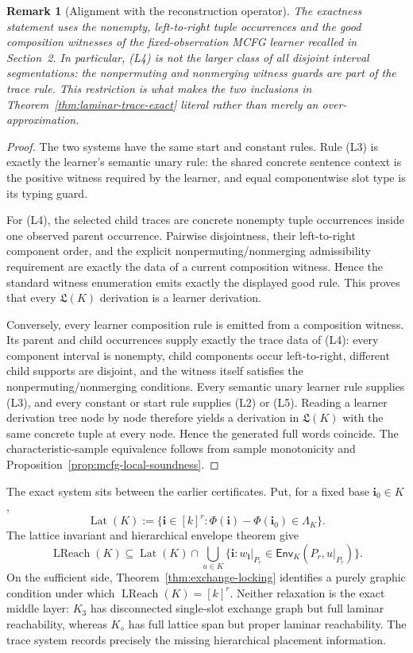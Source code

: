 \documentclass[11pt]{article}
\newtheorem{remark}[definition]{Remark}
\newcommand{\Env}{\mathsf{Env}}
\begin{document}
\begin{remark}[Alignment with the reconstruction operator]
The exactness statement uses the nonempty, left-to-right tuple occurrences and
the good composition witnesses of the fixed-observation MCFG learner recalled in Section~2.  In particular, (L4) is not the larger class of all
disjoint interval segmentations: the nonpermuting and nonmerging witness guards
are part of the trace rule.  This restriction is what makes the two inclusions
in Theorem~\ref{thm:laminar-trace-exact} literal rather than merely an
over-approximation.
\end{remark}

\begin{proof}
The two systems have the same start and constant rules.  Rule (L3) is exactly
the learner's semantic unary rule: the shared concrete sentence context is the
positive witness required by the learner, and equal componentwise slot type is
its typing guard.

For (L4), the selected child traces are concrete nonempty tuple
occurrences inside one observed parent occurrence.  Pairwise disjointness,
their left-to-right component order, and the explicit nonpermuting/nonmerging
admissibility requirement are exactly the data of a current composition
witness.  Hence the standard witness enumeration emits exactly the displayed
good rule.  This proves that every $\mathfrak L(K)$ derivation is a learner
derivation.

Conversely, every learner composition rule is emitted from a composition
witness.  Its parent and child occurrences supply exactly the trace data of
(L4): every component interval is nonempty, child components occur
left-to-right, different child supports are disjoint, and the witness itself
satisfies the nonpermuting/nonmerging conditions.  Every semantic unary learner
rule supplies (L3), and every constant or start rule supplies (L2) or (L5).
Reading a learner derivation tree node by node therefore yields a derivation in
$\mathfrak L(K)$ with the same concrete tuple at every node.  Hence the
generated full words coincide.  The characteristic-sample equivalence follows from sample monotonicity and
Proposition~\ref{prop:mcfg-local-soundness}.
\end{proof}

The exact system sits between the earlier certificates.  Put, for a fixed base
$\mathbf i_0\in K$,
\[
  \operatorname{Lat}(K)
  :=\{\mathbf i\in[k]^r:
       \Phi(\mathbf i)-\Phi(\mathbf i_0)\in\Lambda_K\}.
\]
The lattice invariant and hierarchical envelope theorem give
\[
  \boxed{
  \operatorname{LReach}(K)
  \subseteq
  \operatorname{Lat}(K)
  \cap
  \bigcup_{u\in K}
  \{\mathbf i:
      w_{\mathbf i}|_{P_r}\in\Env_K(P_r,u|_{P_r})\}.
  }
\]
On the sufficient side, Theorem~\ref{thm:exchange-locking} identifies a purely
graphic condition under which $\operatorname{LReach}(K)=[k]^r$.  Neither relaxation is the
exact middle layer: $K_3$ has disconnected single-slot exchange graph but full
laminar reachability, whereas $K_{\diamond}$ has full lattice span but proper
laminar reachability.  The trace system records precisely the missing
hierarchical placement information.
\end{document}
